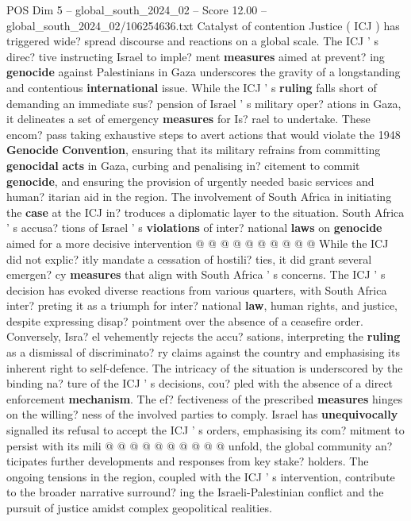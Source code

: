 \begin{textsample}{POS Dim 5 – global\_south\_2024\_02 – Score 12.00 – global\_south\_2024\_02/106254636.txt}  \label{ex:f5_pos_160}
Catalyst of contention Justice ( ICJ ) has triggered wide? spread discourse and reactions on a global scale.
The ICJ ' s direc? tive instructing Israel to imple? ment \textbf{measures} aimed at prevent? ing \textbf{genocide} against Palestinians in Gaza underscores the gravity of a longstanding and contentious \textbf{international} issue.
While the ICJ ' s \textbf{ruling} falls short of demanding an immediate sus? pension of Israel ' s military oper? ations in Gaza, it delineates a set of emergency \textbf{measures} for Is? rael to undertake.
These encom? pass taking exhaustive steps to avert actions that would violate the 1948 \textbf{Genocide} \textbf{Convention}, ensuring that its military refrains from committing \textbf{genocidal} \textbf{acts} in Gaza, curbing and penalising in? citement to commit \textbf{genocide}, and ensuring the provision of urgently needed basic services and human? itarian aid in the region.
The involvement of South Africa in initiating the \textbf{case} at the ICJ in? troduces a diplomatic layer to the situation.
South Africa ' s accusa? tions of Israel ' s \textbf{violations} of inter? national \textbf{laws} on \textbf{genocide} aimed for a more decisive intervention @ @ @ @ @ @ @ @ @ @ While the ICJ did not explic? itly mandate a cessation of hostili? ties, it did grant several emergen? cy \textbf{measures} that align with South Africa ' s concerns.
The ICJ ' s decision has evoked diverse reactions from various quarters, with South Africa inter? preting it as a triumph for inter? national \textbf{law}, human rights, and justice, despite expressing disap? pointment over the absence of a ceasefire order.
Conversely, Isra? el vehemently rejects the accu? sations, interpreting the \textbf{ruling} as a dismissal of discriminato? ry claims against the country and emphasising its inherent right to self-defence.
The intricacy of the situation is underscored by the binding na? ture of the ICJ ' s decisions, cou? pled with the absence of a direct enforcement \textbf{mechanism}.
The ef? fectiveness of the prescribed \textbf{measures} hinges on the willing? ness of the involved parties to comply.
Israel has \textbf{unequivocally} signalled its refusal to accept the ICJ ' s orders, emphasising its com? mitment to persist with its mili @ @ @ @ @ @ @ @ @ @ unfold, the global community an? ticipates further developments and responses from key stake? holders.
The ongoing tensions in the region, coupled with the ICJ ' s intervention, contribute to the broader narrative surround? ing the Israeli-Palestinian conflict and the pursuit of justice amidst complex geopolitical realities.

\end{textsample}
